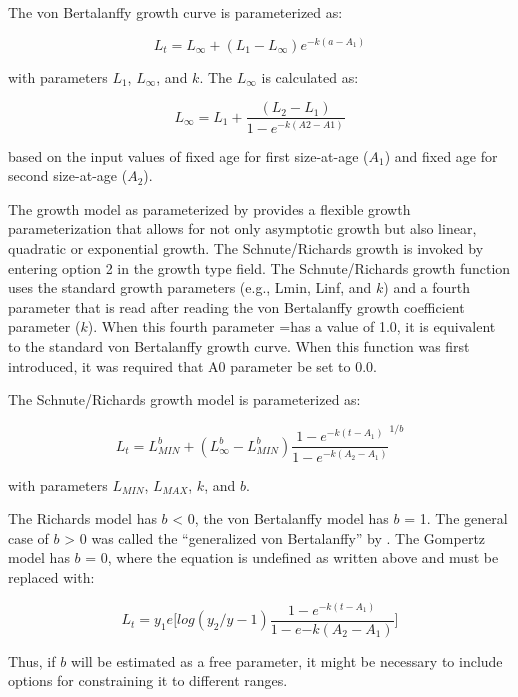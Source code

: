 The von Bertalanffy growth curve is parameterized as:

\begin{equation}
	L_t = L_\infty + (L_{1}-L_\infty)e^{-k(a-A_{1})}
\end{equation}

with parameters $L_{1}$, $L_\infty$, and $k$. The $L_\infty$ is calculated as:

\begin{equation}
	L_\infty = L_{1} + \frac{(L_2 - L_1)}{1-e^{-k(A2-A1)}}
\end{equation}

based on the input values of fixed age for first size-at-age ($A_1$) and fixed age for second size-at-age ($A_2$). 

The \citet{richards1959growth} growth model as parameterized by \citet{schnute1981growth} provides a flexible growth parameterization that allows for not only asymptotic growth but also linear, quadratic or exponential growth. The Schnute/Richards growth is invoked by entering option 2 in the growth type field. The Schnute/Richards growth function uses the standard growth parameters (e.g., Lmin, Linf, and $k$) and a fourth parameter that is read after reading the von Bertalanffy growth coefficient parameter ($k$). When this fourth parameter =has a value of 1.0, it is equivalent to the standard von Bertalanffy growth curve. When this function was first introduced, it was required that A0 parameter be set to 0.0.

The Schnute/Richards growth model is parameterized as:

\begin{equation}
		L_t = L_{MIN}^b + (L_\infty^b-L_{MIN}^b)\frac{1-e^{-k(t-A_{1})}}{1-e^{-k(A_2-A_1)}}^{1/b}
\end{equation}

with parameters $L_{MIN}$, $L_{MAX}$, $k$, and $b$.

The Richards model has $b$ < 0, the von Bertalanffy model has $b$ = 1. The general case of $b$ > 0 was called the ``generalized von Bertalanffy'' by \citet{schnute1981growth}. The Gompertz model has $b$ = 0, where the equation is undefined as written above and must be replaced with: 

\begin{equation}
		L_t = y_1e\Big[log(y_2/y-1)\frac{1-e^{-k(t-A_1)}}{1-e{-k(A_2-A_1)}}\Big]
\end{equation}

Thus, if $b$ will be estimated as a free parameter, it might be necessary to include options for constraining it to different ranges.

